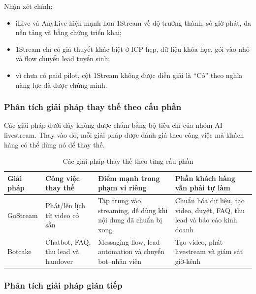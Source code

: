 Nhận xét chính:
\begin{itemize}
    \item iLive và AnyLive hiện mạnh hơn 1Stream về độ trưởng thành, số giờ phát,
    đa nền tảng và bằng chứng triển khai;
    \item 1Stream chỉ có giả thuyết khác biệt ở ICP hẹp, dữ liệu khóa học, gói vào
    nhỏ và flow chuyển lead tuyển sinh;
    \item vì chưa có paid pilot, cột 1Stream không được diễn giải là ``Có'' theo
    nghĩa năng lực đã được chứng minh.
\end{itemize}

\subsubsection{Phân tích giải pháp thay thế theo cấu phần}

Các giải pháp dưới đây không được chấm bằng bộ tiêu chí của nhóm AI livestream.
Thay vào đó, mỗi giải pháp được đánh giá theo công việc mà khách hàng có thể dùng
nó để thay thế.

\begin{table}[H]
    \centering
    \footnotesize
    \setlength{\tabcolsep}{4pt}
    \renewcommand{\arraystretch}{1.25}
    \caption{Các giải pháp thay thế theo từng cấu phần}
    \label{tab:component-substitutes}
    \begin{tabularx}{\linewidth}{@{}L{2.8cm}L{3.2cm}Y Y@{}}
        \toprule
        \textbf{Giải pháp} & \textbf{Công việc thay thế} &
        \textbf{Điểm mạnh trong phạm vi riêng} &
        \textbf{Phần khách hàng vẫn phải tự làm} \\ \midrule

        GoStream &
        Phát/lên lịch từ video có sẵn &
        Tập trung vào streaming, dễ dùng khi nội dung đã chuẩn bị xong &
        Chuẩn hóa dữ liệu, tạo video, duyệt, FAQ, thu lead và báo cáo kinh doanh \\

        Botcake &
        Chatbot, FAQ, thu lead và handover &
        Messaging flow, lead automation và chuyển bot--nhân viên &
        Tạo video, phát livestream và giám sát giờ-kênh \\ \bottomrule
    \end{tabularx}
\end{table}

\subsubsection{Phân tích giải pháp gián tiếp}

